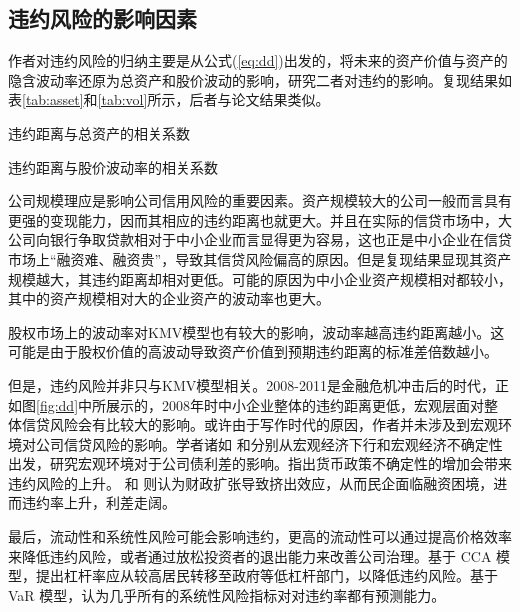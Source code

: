 \documentclass[a4paper,12pt]{ctexart}
\begin{document}
\subsection{违约风险的影响因素}
作者对违约风险的归纳主要是从公式(\ref{eq:dd})出发的，将未来的资产价值与资产的隐含波动率还原为总资产和股价波动的影响，研究二者对违约的影响。复现结果如表\ref{tab:asset}和\ref{tab:vol}所示，后者与论文结果类似。
\begin{table}[H]
    \centering
    
    \caption{违约距离与总资产的相关系数}\label{tab:asset}
\end{table}
\begin{table}[H]
    \centering
    
    \caption{违约距离与股价波动率的相关系数}\label{tab:vol}
\end{table}

公司规模理应是影响公司信用风险的重要因素。资产规模较大的公司一般而言具有更强的变现能力，因而其相应的违约距离也就更大。并且在实际的信贷市场中，大公司向银行争取贷款相对于中小企业而言显得更为容易，这也正是中小企业在信贷市场上“融资难、融资贵”，导致其信贷风险偏高的原因。但是复现结果显现其资产规模越大，其违约距离却相对更低。可能的原因为中小企业资产规模相对都较小，其中的资产规模相对大的企业资产的波动率也更大。

股权市场上的波动率对KMV模型也有较大的影响，波动率越高违约距离越小。这可能是由于股权价值的高波动导致资产价值到预期违约距离的标准差倍数越小。

但是，违约风险并非只与KMV模型相关。2008-2011是金融危机冲击后的时代，正如图\ref{fig:dd}中所展示的，2008年时中小企业整体的违约距离更低，宏观层面对整体信贷风险会有比较大的影响。或许由于写作时代的原因，作者并未涉及到宏观环境对公司信贷风险的影响。学者诸如\citet{bai2019common} 和\citet{bali2021macroeconomic}分别从宏观经济下行和宏观经济不确定性出发，研究宏观环境对于公司债利差的影响。\citet{王博2019货币政策不确定性}指出货币政策不确定性的增加会带来违约风险的上升。\citet{梅冬州2021财政扩张} 和\citet{2020Fiscal} 则认为财政扩张导致挤出效应，从而民企面临融资困境，进而违约率上升，利差走阔。

最后，流动性和系统性风险可能会影响违约\cite{brogaard2017stock}，更高的流动性可以通过提高价格效率来降低违约风险，或者通过放松投资者的退出能力来改善公司治理。\citet{苟文均2016债务杠杆与系统性风险传染机制}基于 CCA 模型，提出杠杆率应从较高居民转移至政府等低杠杆部门，以降低违约风险。\citet{2020Do}基于 VaR 模型，认为几乎所有的系统性风险指标对对违约率都有预测能力。
\end{document}
